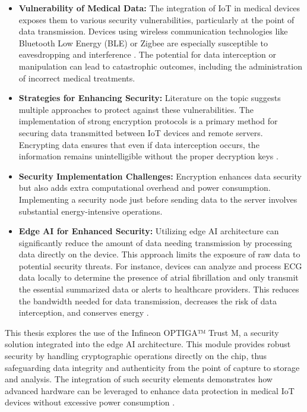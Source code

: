 \begin{itemize}
	\item \textbf{Vulnerability of Medical Data:} The integration of IoT in medical devices exposes them to various security vulnerabilities, particularly at the point of data transmission. Devices using wireless communication technologies like Bluetooth Low Energy (BLE) or Zigbee are especially susceptible to eavesdropping and interference \cite{Paul2023, Bresson2004}. The potential for data interception or manipulation can lead to catastrophic outcomes, including the administration of incorrect medical treatments.

	\item \textbf{Strategies for Enhancing Security:} Literature on the topic suggests multiple approaches to protect against these vulnerabilities. The implementation of strong encryption protocols is a primary method for securing data transmitted between IoT devices and remote servers. Encrypting data ensures that even if data interception occurs, the information remains unintelligible without the proper decryption keys \cite{Paul2023, Bresson2004}.

	\item \textbf{Security Implementation Challenges:} Encryption enhances data security but also adds extra computational overhead and power consumption. Implementing a security node just before sending data to the server involves substantial energy-intensive operations.

	\item \textbf{Edge AI for Enhanced Security:} Utilizing edge AI architecture can significantly reduce the amount of data needing transmission by processing data directly on the device. This approach limits the exposure of raw data to potential security threats. For instance, devices can analyze and process ECG data locally to determine the presence of atrial fibrillation and only transmit the essential summarized data or alerts to healthcare providers. This reduces the bandwidth needed for data transmission, decreases the risk of data interception, and conserves energy \cite{Paul2023}.
\end{itemize}

\noindent This thesis explores the use of the Infineon OPTIGA™ Trust M, a security solution integrated into the edge AI architecture. This module provides robust security by handling cryptographic operations directly on the chip, thus safeguarding data integrity and authenticity from the point of capture to storage and analysis. The integration of such security elements demonstrates how advanced hardware can be leveraged to enhance data protection in medical IoT devices without excessive power consumption \cite{infineon-optiga-trust}.\\
